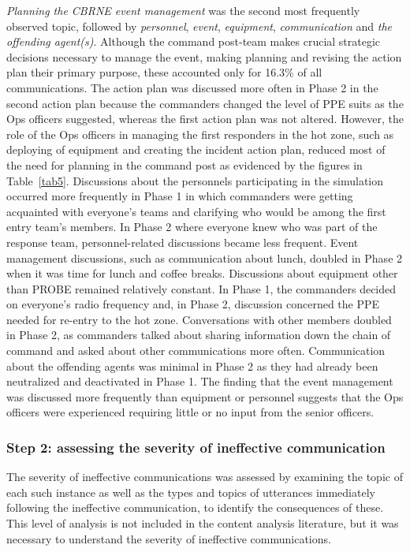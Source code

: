 \documentclass[link]{IWCOMP}
\begin{document}
\textit{Planning the CBRNE event management} was the second most frequently observed topic, followed by \textit{personnel}, \textit{event}, \textit{equipment},
\textit{communication} and \textit{the offending agent(s)}. Although the command post-team makes crucial strategic decisions
necessary to manage the event, making planning and revising the action plan
their primary purpose, these accounted only for 16.3{\%} of all
communications. The action plan was discussed more often in Phase 2 in the
second action plan because the commanders changed the level of PPE suits as
the Ops officers suggested, whereas the first action plan was not altered.
However, the role of the Ops officers in managing the first responders in
the hot zone, such as deploying of equipment and creating the incident
action plan, reduced most of the need for planning in the command post as
evidenced by the figures in Table~\ref{tab5}. Discussions about the personnels
participating in the simulation occurred more frequently in Phase 1 in which
commanders were getting acquainted with everyone's teams and clarifying who
would be among the first entry team's members. In Phase 2 where everyone
knew who was part of the response team, personnel-related discussions became
less frequent. Event management discussions, such as communication about
lunch, doubled in Phase 2 when it was time for lunch and coffee breaks.
Discussions about equipment other than PROBE remained relatively constant.
In Phase 1, the commanders decided on everyone's radio frequency and, in
Phase 2, discussion concerned the PPE needed for re-entry to the hot zone.
Conversations with other members doubled in Phase 2, as commanders talked
about sharing information down the chain of command and asked about other
communications more often. Communication about the offending agents was
minimal in Phase 2 as they had already been neutralized and deactivated in
Phase 1. The finding that the event management was discussed more frequently
than equipment or personnel suggests that the Ops officers were experienced
requiring little or no input from the senior officers.

\subsubsection{Step 2: assessing the severity of ineffective \hbox{communication}}\label{subsubsec4.3.2}

The severity of ineffective communications was assessed by examining the
topic of each such instance as well as the types and topics of utterances
immediately following the ineffective communication, to identify the
consequences of these. This level of analysis is not included in the content
analysis literature, but it was necessary to understand the severity of
ineffective communications.
\end{document}
